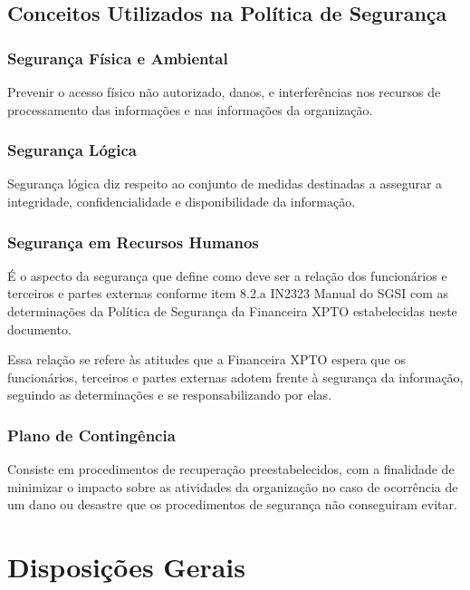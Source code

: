 \documentclass[a4paper,12pt]{article}
\begin{document}
\subsection{Conceitos Utilizados na Política de Segurança}

\subsubsection{Segurança Física e Ambiental}

Prevenir o acesso físico não autorizado, danos, e interferências nos recursos de processamento das informações e nas informações da organização.

\subsubsection{Segurança Lógica}

Segurança lógica diz respeito ao conjunto de medidas destinadas a assegurar a integridade, confidencialidade e disponibilidade da informação.

\subsubsection{Segurança em Recursos Humanos}

É o aspecto da segurança que define como deve ser a relação dos funcionários e terceiros e partes externas conforme item 8.2.a IN2323 Manual do SGSI com as determinações da Política de Segurança da Financeira XPTO estabelecidas neste documento.

Essa relação se refere às atitudes que a Financeira XPTO espera que os funcionários, terceiros e partes externas adotem frente à segurança da informação, seguindo as determinações e se responsabilizando por elas. 

\subsubsection{Plano de Contingência}

Consiste em procedimentos de recuperação preestabelecidos, com a finalidade de minimizar o impacto sobre as atividades da organização no caso de ocorrência de um dano ou desastre que os procedimentos de segurança não conseguiram evitar.

\section{Disposições Gerais}
\end{document}
